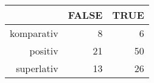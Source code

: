 \begin{tabular}{rrr}
  \hline
 & FALSE & TRUE \\ 
  \hline
komparativ & 8 & 6 \\ 
  positiv & 21 & 50 \\ 
  superlativ & 13 & 26 \\ 
   \hline
\end{tabular}
